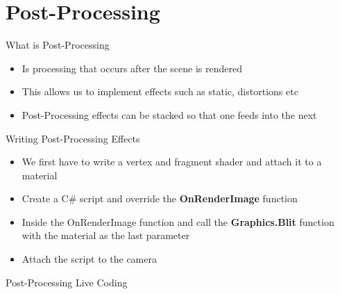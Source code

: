 \part{Post-Processing}
\frame{\partpage}


\begin{frame}{What is Post-Processing}
	\begin{itemize}
		\item Is processing that occurs after the scene is rendered
		\pause\item This allows us to implement effects such as static, distortions etc
		\pause\item Post-Processing effects can be stacked so that one feeds into the next
	\end{itemize}
\end{frame}

\begin{frame}{Writing Post-Processing Effects}
	\begin{itemize}
		\item We first have to write a vertex and fragment shader and attach it to a material
		\pause\item Create a C\# script and override the \textbf{OnRenderImage} function
		\pause\item Inside the OnRenderImage function and call the \textbf{Graphics.Blit} function with the material as the last parameter
		\pause\item Attach the script to the camera
	\end{itemize}
\end{frame}

\begin{frame}
	\begin{center}
		Post-Processing Live Coding
	\end{center}
\end{frame}
